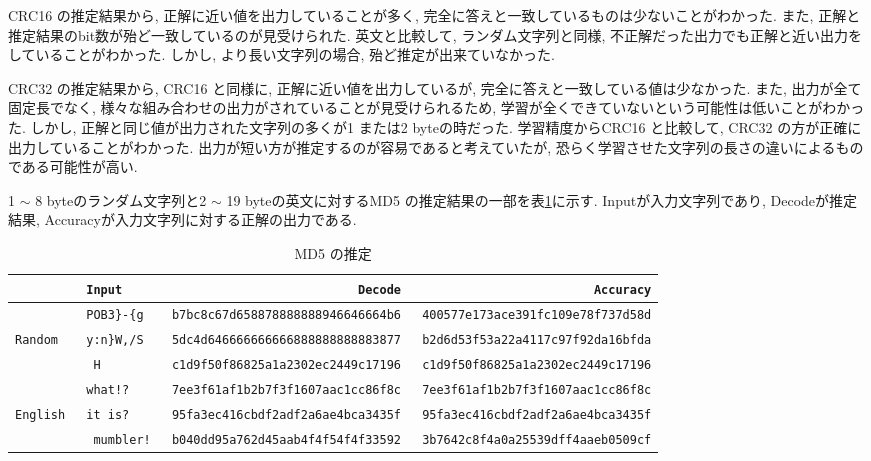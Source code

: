 \documentclass[11pt]{jbook}
\begin{document}
CRC16 の推定結果から, 正解に近い値を出力していることが多く, 完全に答えと一致しているものは少ないことがわかった.
また, 正解と推定結果のbit数が殆ど一致しているのが見受けられた.
英文と比較して, ランダム文字列と同様, 不正解だった出力でも正解と近い出力をしていることがわかった.
しかし, より長い文字列の場合, 殆ど推定が出来ていなかった.

CRC32 の推定結果から, CRC16 と同様に, 正解に近い値を出力しているが, 完全に答えと一致している値は少なかった.
また, 出力が全て固定長でなく, 様々な組み合わせの出力がされていることが見受けられるため, 学習が全くできていないという可能性は低いことがわかった.
しかし, 正解と同じ値が出力された文字列の多くが1 または2 byteの時だった.
学習精度からCRC16 と比較して, CRC32 の方が正確に出力していることがわかった.
出力が短い方が推定するのが容易であると考えていたが, 恐らく学習させた文字列の長さの違いによるものである可能性が高い.

\newpage

1 $\sim$ 8 byteのランダム文字列と2 $\sim$ 19 byteの英文に対するMD5 の推定結果の一部を表\ref{md5_suitei}に示す.
Inputが入力文字列であり, Decodeが推定結果, Accuracyが入力文字列に対する正解の出力である.\\

\begin{table}[htp]

    \caption{MD5 の推定}
    \smallskip
    \small
    \begin{tabular}{|l|l|r|r|}
    \hline
       &\texttt{Input }&\texttt{Decode }&\texttt{Accuracy}    \\ \hline
     &\texttt{POB3\}-\{g }&\texttt{b7bc8c67d658878888888946646664b6 }&\texttt{400577e173ace391fc109e78f737d58d} \\ \cline{2-4}
    \texttt{Random }&\texttt{y:n\}W,/S}&\texttt{5dc4d646666666666888888888883877 }&\texttt{b2d6d53f53a22a4117c97f92da16bfda} \\ \cline{2-4}
    &\texttt{ H }&\texttt{c1d9f50f86825a1a2302ec2449c17196 }&\texttt{c1d9f50f86825a1a2302ec2449c17196}  \\ \hline
    &\texttt{what!?  }&\texttt{7ee3f61af1b2b7f3f1607aac1cc86f8c }&\texttt{7ee3f61af1b2b7f3f1607aac1cc86f8c} \\ \cline{2-4}
   \texttt{English }&\texttt{it is? }&\texttt{95fa3ec416cbdf2adf2a6ae4bca3435f }&\texttt{95fa3ec416cbdf2adf2a6ae4bca3435f} \\ \cline{2-4}
   &\texttt{  mumbler! }&\texttt{b040dd95a762d45aab4f4f54f4f33592 }&\texttt{3b7642c8f4a0a25539dff4aaeb0509cf} \\ \hline

    \end{tabular}
    \label{md5_suitei}

\end{table}
\end{document}
